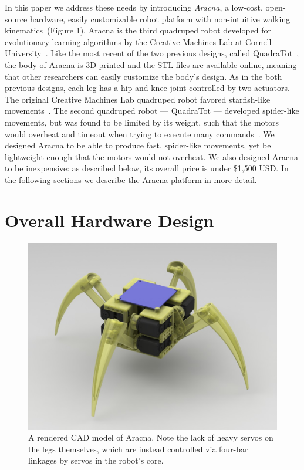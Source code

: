 \documentclass[letterpaper]{article}
\begin{document}
In this paper we address these needs by introducing \emph{Aracna}, a low-cost, open-source hardware, easily customizable robot platform with non-intuitive walking
kinematics~(Figure 1). Aracna is the third quadruped robot developed for evolutionary learning algorithms by the Creative Machines Lab at Cornell University~\citep{bongard2006resilient, yosinski2011gaits}. Like the most recent of the two previous designs, called QuadraTot~\citep{yosinski2011gaits}, the body of Aracna is 3D printed and the STL files are available online,
meaning that other researchers can easily customize the body's design. As in the both previous designs, each leg has a hip and knee joint controlled by two actuators. The original Creative
Machines Lab quadruped robot favored starfish-like movements~\citep{bongard2006resilient}. The second quadruped robot --- QuadraTot ---
developed spider-like movements, but was found to be limited by its
weight, such that the motors would overheat and timeout when trying to execute many commands~\citep{yosinski2011gaits, Glette2012Evolution}. We designed Aracna to be able to produce fast, spider-like movements, yet be lightweight enough that the motors would not overheat. We also designed Aracna to be inexpensive: as described below, its overall price is under \$1,500  USD. In the following sections we describe the Aracna platform in more detail. 




\section{Overall Hardware Design}

\begin{figure}[t]
\begin{center}
\includegraphics[width=\columnwidth]{fig5.jpg}
\caption{A rendered CAD model of Aracna. Note the lack of heavy servos on the legs themselves, which are instead controlled via four-bar linkages by servos in the robot's core.}
\label{cadModelOfRobot}
\end{center}
\end{figure}
\end{document}
